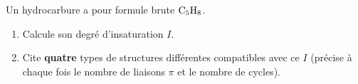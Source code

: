 \documentclass[11pt,a4paper]{article}
\begin{document}
\begin{exo}[Que peut cacher $I=2$ ?]
Un hydrocarbure a pour formule brute $\ce{C5H8}$.
\begin{enumerate}[label=\alph*)]
  \item Calcule son degré d'insaturation $I$.
  \item Cite \textbf{quatre} types de structures différentes compatibles avec ce $I$ (précise à chaque fois le nombre de liaisons $\pi$ et le nombre de cycles).
\end{enumerate}
\end{exo}
\end{document}
